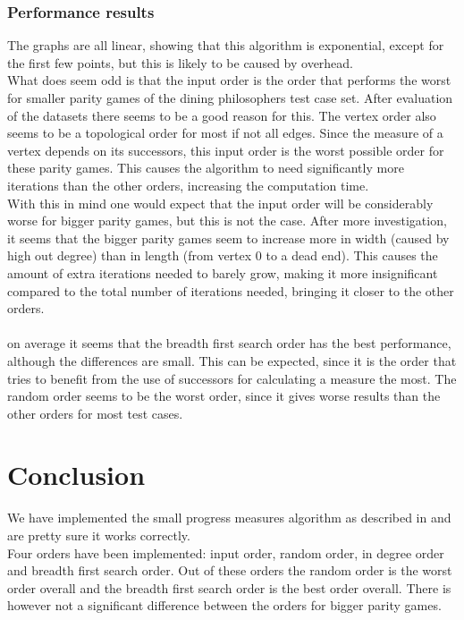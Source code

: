 \documentclass[10pt,a4paper]{article}
\begin{document}
\subsubsection{Performance results}
The graphs are all linear, showing that this algorithm is exponential, except for the first few points, but this is likely to be caused by overhead.\\
What does seem odd is that the input order is the order that performs the worst for smaller parity games of the dining philosophers test case set. After evaluation of the datasets there seems to be a good reason for this. The vertex order also seems to be a topological order for most if not all edges. Since the measure of a vertex depends on its successors, this input order is the worst possible order for these parity games. This causes the algorithm to need significantly more iterations than the other orders, increasing the computation time.\\
With this in mind one would expect that the input order will be considerably worse for bigger parity games, but this is not the case. After more investigation, it seems that the bigger parity games seem to increase more in width (caused by high out degree) than in length (from vertex 0 to a dead end). This causes the amount of extra iterations needed to barely grow, making it more insignificant compared to the total number of iterations needed, bringing it closer to the other orders.
\\\\
on average it seems that the breadth first search order has the best performance, although the differences are small. This can be expected, since it is the order that tries to benefit from the use of successors for calculating a measure the most. The random order seems to be the worst order, since it gives worse results than the other orders for most test cases.

\section{Conclusion}\label{conc}
We have implemented the small progress measures algorithm as described in \cite{spmpaper} and are pretty sure it works correctly.\\
Four orders have been implemented: input order, random order, in degree order and breadth first search order. Out of these orders the random order is the worst order overall and the breadth first search order is the best order overall. There is however not a significant difference between the orders for bigger parity games.
\end{document}
